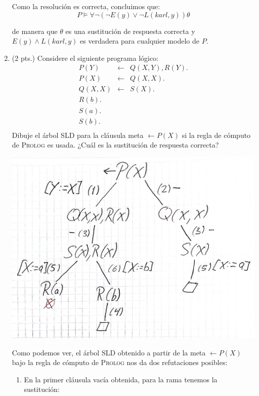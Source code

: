 \documentclass[12pt,letterpaper]{article}
\newcommand{\dmp}{\leftarrow}
\begin{document}
\begin{enumerate}
  Como la resolución es correcta, concluimos que:
  \[
  P \vDash \forall \neg(\neg E(y) \lor \neg L(karl,y)) \theta
  \]
  
  de manera que $\theta$ es una sustitución de respuesta correcta y $E(y) \land L(karl, y)$ es verdadera para cualquier modelo de $P$.
  \bigskip
  
\item (2 pts.) Considere el siguiente programa lógico:
  \[
  \begin{array}{lll}
    P(Y) &\leftarrow& Q(X,Y),R(Y).\\
    P(X) &\leftarrow& Q(X,X).\\
    Q(X,X) &\leftarrow& S(X).\\
    R(b).\\
    S(a).\\
    S(b).\\
  \end{array}
  \]
  Dibuje el árbol SLD para la cláusula meta $\dmp P(X)$ si la regla de cómputo de \textsc{Prolog} es usada. ¿Cuál es la sustitución de respuesta correcta?

  \medskip

  \begin{center}
    \hspace{-1.2cm} \includegraphics[width=\textwidth,height=0.54\textheight,keepaspectratio]{tree.png}
  \end{center}
  
  Como podemos ver, el árbol SLD obtenido a partir de la meta $\dmp P(X)$ bajo la regla de cómputo de \textsc{Prolog} nos da dos refutaciones posibles:
  \begin{enumerate}[label=\arabic*)]
  \item En la primer cl\'{a}usula vac\'{i}a obtenida, para la rama tenemos la sustitución:
    

\end{enumerate}
\end{enumerate}
\end{document}
